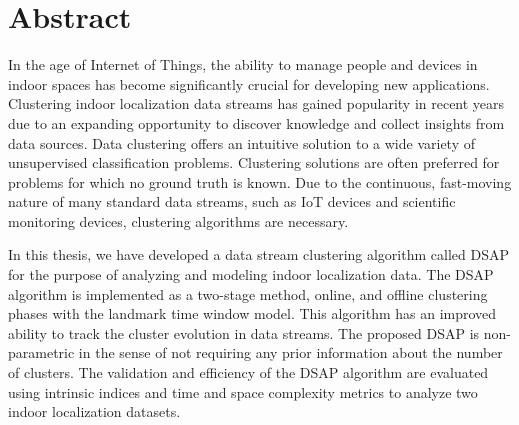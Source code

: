 \doublespacing
\setlength{\parindent}{2em}

\chapter*{Abstract}

 In the age of Internet of Things, the ability to manage people and devices in indoor spaces has become significantly crucial for developing new applications. %
 Clustering indoor localization data streams has gained popularity in recent years due to an expanding opportunity to discover knowledge and collect insights from data sources. Data clustering offers an intuitive solution to a wide variety of unsupervised classification problems. Clustering solutions are often preferred for problems for which no ground truth is known. Due to the continuous, fast-moving nature of many standard data streams, such as IoT devices and scientific monitoring devices, clustering algorithms are necessary.
 
 
 
 In this thesis, we have developed a data stream clustering algorithm called DSAP for the purpose of analyzing and modeling indoor localization data. The DSAP algorithm is implemented as a two-stage method, online, and offline clustering phases with the landmark time window model.  This algorithm has an improved ability to track the cluster evolution in data streams. The proposed DSAP is non-parametric in the sense of not requiring any prior information about the number of clusters. The validation and efficiency of the DSAP algorithm are evaluated using intrinsic indices and time and space complexity metrics to analyze two indoor localization datasets. 




